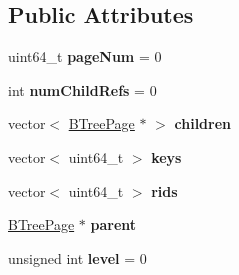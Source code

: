 \subsection*{Public Attributes}
\begin{DoxyCompactItemize}
\item 
\hypertarget{class_b_tree_page_adcb8f9ed6fa5ab538347b2538d16b2ec}{}uint64\+\_\+t {\bfseries page\+Num} = 0\label{class_b_tree_page_adcb8f9ed6fa5ab538347b2538d16b2ec}

\item 
\hypertarget{class_b_tree_page_adc38acfd7f3e7176478a2e62a3d69394}{}int {\bfseries num\+Child\+Refs} = 0\label{class_b_tree_page_adc38acfd7f3e7176478a2e62a3d69394}

\item 
\hypertarget{class_b_tree_page_a1b431b5ce5f434d1e689caea6402a9bc}{}vector$<$ \hyperlink{class_b_tree_page}{B\+Tree\+Page} $\ast$ $>$ {\bfseries children}\label{class_b_tree_page_a1b431b5ce5f434d1e689caea6402a9bc}

\item 
\hypertarget{class_b_tree_page_a0986ecaf3fc280e005810a2418761abc}{}vector$<$ uint64\+\_\+t $>$ {\bfseries keys}\label{class_b_tree_page_a0986ecaf3fc280e005810a2418761abc}

\item 
\hypertarget{class_b_tree_page_a2b24fbe8ab336eecbcd873f7d3eaf23f}{}vector$<$ uint64\+\_\+t $>$ {\bfseries rids}\label{class_b_tree_page_a2b24fbe8ab336eecbcd873f7d3eaf23f}

\item 
\hypertarget{class_b_tree_page_a2c78cff1e68ce6a7249fde41ec2db837}{}\hyperlink{class_b_tree_page}{B\+Tree\+Page} $\ast$ {\bfseries parent}\label{class_b_tree_page_a2c78cff1e68ce6a7249fde41ec2db837}

\item 
\hypertarget{class_b_tree_page_aca9f838a9d26413fe153386d2b36ec3d}{}unsigned int {\bfseries level} = 0\label{class_b_tree_page_aca9f838a9d26413fe153386d2b36ec3d}

\end{DoxyCompactItemize}
